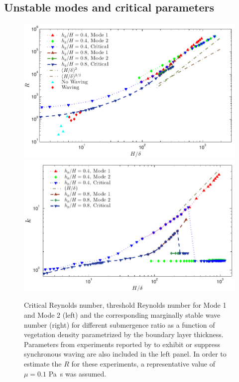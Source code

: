 \documentclass[12pt]{report}   %
\newcommand{\Rey}{{R}}
\begin{document}
\subsection{Unstable modes and critical parameters}
\begin{figure}
\begin{center}
\includegraphics[scale = 0.95]{new_graph_R_vs_delta}\\
\includegraphics[scale = 0.95]{new_graph_K_vs_delta}
\end{center}
\caption{
Critical Reynolds number, threshold Reynolds number for Mode 1 and Mode 2 (left) and the corresponding marginally stable wave number (right) for different submergence ratio as a function of vegetation density parametrized by the boundary layer thickness. 
Parameters from experiments reported by \cite{Ghisal02} to exhibit or suppress synchronous waving are also included in the left panel. 
In order to estimate the $\Rey$ for these experiments, a representative value of $\mu=0.1$ Pa~s was assumed.
}
\label{Re_vs_delta}
\end{figure}
\end{document}

